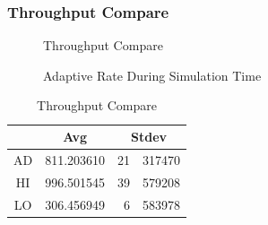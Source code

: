 \subsubsection{Throughput Compare}
\begin{figure}[H]
    \centering
    \caption{Throughput Compare}
\end{figure}

\begin{figure}[H]
    \centering
    \caption{Adaptive Rate During Simulation Time}
\end{figure}

\begin{table}[H]
    \centering
    \setlength{\extrarowheight}{2mm}
    \addtolength{\tabcolsep}{3mm}
    \begin{tabular}{c c r@{.}l}
        \hline \hline
        &  Avg & \multicolumn{2}{c}{Stdev} \\
        \hline
        AD & 811.203610 & 21&317470 \\
        HI & 996.501545 & 39&579208 \\
        LO & 306.456949 & 6&583978 \\
        \hline
    \end{tabular}
    \caption{Throughput Compare}
\end{table}

